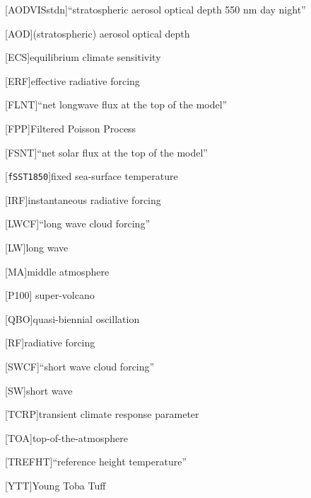 \documentclass{ametsocV5}
\begin{document}
%

\begin{acronym}[AODVISstdn]
  [AODVISstdn]{``stratospheric aerosol optical depth 550 nm day night''}

  [AOD]{(stratospheric) aerosol optical depth}

  [ECS]{equilibrium climate sensitivity}

  [ERF]{effective radiative forcing}

  [FLNT]{``net longwave flux at the top of the model''}

  [FPP]{Filtered Poisson Process}

  [FSNT]{``net solar flux at the top of the model''}

  [\texttt{fSST1850}]{fixed sea-surface temperature}

  [IRF]{instantaneous radiative forcing}

  [LWCF]{``long wave cloud forcing''}

  [LW]{long wave}

  [MA]{middle atmosphere}

  [P100]{\citet{jones2005} super-volcano}

  [QBO]{quasi-biennial oscillation}

  [RF]{radiative forcing}

  [SWCF]{``short wave cloud forcing''}

  [SW]{short wave}

  [TCRP]{transient climate response parameter}

  [TOA]{top-of-the-atmosphere}

  [TREFHT]{``reference height temperature''}

  [YTT]{Young Toba Tuff}


\end{acronym}
\end{document}
